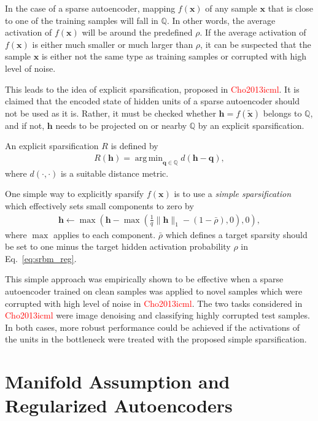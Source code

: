 \documentclass{now}
\newcommand{\vect}[1]{\mathbf{#1}}
\newcommand{\vh}[0]{\vect{h}}
\newcommand{\vx}[0]{\vect{x}}
\newcommand{\vq}[0]{\vect{q}}
\newcommand{\alert}[1]{\textcolor{red}{#1}}
\newcommand{\QQ}[0]{\mathbb{Q}}
\DeclareMathOperator*{\argmin}{arg\,min}
\newcommand{\citepub}[1]{\alert{#1}}
\begin{document}
In the case of a sparse autoencoder, mapping $f(\vx)$ of any
sample $\vx$ that is close to one of the training samples will
fall in $\QQ$. In other words, the average activation of
$f(\vx)$ will be around the predefined $\rho$. If the
average activation of $f(\vx)$ is either much smaller or
much larger than $\rho$, it can be suspected that the sample
$\vx$ is either not the same type as training samples or
corrupted with high level of noise.

This leads to the idea of explicit sparsification, proposed
in \citepub{Cho2013icml}. It is claimed that the encoded
state of hidden units of a sparse autoencoder should not be
used as it is. Rather, it must be checked whether $\vh =
f(\tilde{\vx})$ belongs to $\QQ$, and if not, $\vh$ needs to
be projected on or nearby $\QQ$ by an explicit
sparsification.

An explicit sparsification $R$ is defined by 
\begin{align}
    \label{eq:esp}
    R(\vh) = \argmin_{\vq \in \QQ} d(\vh - \vq),
\end{align}
where $d(\cdot, \cdot)$ is a suitable distance metric.

One simple way to explicitly sparsify $f(\vx)$ is to use a
\textit{simple sparsification} which effectively sets small
components to zero by
\begin{align}
    \label{eq:simple_sparsification}
    \vh \leftarrow \max\left(\vh - \max\left(\frac{1}{q}
    \|\vh\|_1 - \left(1 - \bar{\rho}\right), 0\right),
    0\right),
\end{align}
where $\max$ applies to each component. 
$\bar{\rho}$ which defines a target sparsity should be set to one
minus the target hidden activation probability $\rho$ in
Eq.~\eqref{eq:srbm_reg}.

This simple approach was empirically shown to be effective
when a sparse autoencoder trained on clean samples was
applied to novel samples which were corrupted with high
level of noise in \citepub{Cho2013icml}. The two tasks
considered in \citepub{Cho2013icml} were image
denoising and classifying highly corrupted test
samples. In both cases, more robust performance could be
achieved if the activations of the units in the bottleneck
were treated with the proposed simple sparsification.

\section{Manifold Assumption and Regularized Autoencoders}
\label{sec:dae_cae}
\end{document}
